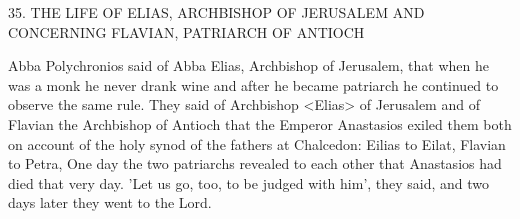 35. THE LIFE OF ELIAS, ARCHBISHOP OF JERUSALEM
AND CONCERNING FLAVIAN, PATRIARCH OF ANTIOCH

Abba Polychronios said of Abba Elias, Archbishop of Jerusalem,
that when he was a monk he never drank wine and after he became
patriarch he continued to observe the same rule. They said of
Archbishop <Elias> of Jerusalem and of Flavian the Archbishop of
Antioch that the Emperor Anastasios exiled them both on account
of the holy synod of the fathers at Chalcedon: Eilias to Eilat,
Flavian to Petra, One day the two patriarchs revealed to each other
that Anastasios had died that very day. 'Let us go, too, to be judged
with him', they said, and two days later they went to the Lord.

